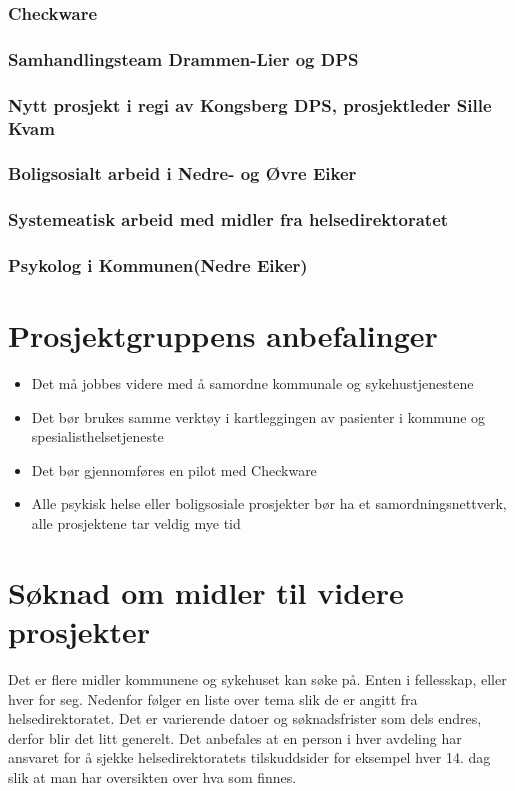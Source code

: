 \documentclass[11pt]{report} %
\begin{document}
                  \subsubsection{Checkware}  
                  \subsubsection{Samhandlingsteam Drammen-Lier og DPS}
                  \subsubsection{Nytt prosjekt i regi av Kongsberg DPS, prosjektleder Sille Kvam}
                  \subsubsection{Boligsosialt arbeid i Nedre- og Øvre Eiker}
                  \subsubsection{Systemeatisk arbeid med midler fra helsedirektoratet}
                  \subsubsection{Psykolog i Kommunen(Nedre Eiker)}
                \section{Prosjektgruppens anbefalinger}\label{chap:vvidere_anbef}
                  \begin{itemize}
                    \item Det må jobbes videre med å samordne kommunale og sykehustjenestene\\
                    \item Det bør brukes samme verktøy i kartleggingen av pasienter i kommune og spesialisthelsetjeneste\\
                    \item Det bør gjennomføres en pilot med Checkware\\
                    \item Alle psykisk helse eller boligsosiale prosjekter bør ha et samordningsnettverk, alle prosjektene tar veldig mye tid\\
                  \end{itemize}
                \section{Søknad om midler til videre prosjekter}\label{chap:vvidere_soknmid}
                  Det er flere midler kommunene og sykehuset kan søke på. Enten i fellesskap, eller hver for seg. Nedenfor følger en liste over tema slik de er angitt fra helsedirektoratet. Det er varierende datoer og søknadsfrister som dels endres, derfor blir det litt generelt. Det anbefales at en person i hver avdeling har ansvaret for å sjekke helsedirektoratets tilskuddsider for eksempel hver 14. dag slik at man har oversikten over hva som finnes.\\
\end{document}
